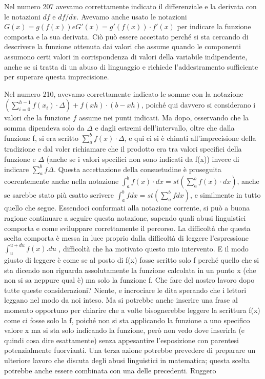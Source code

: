 Nel numero 207 avevamo correttamente indicato il differenziale e la derivata 
con le notazioni \(df\) e \(df / dx\). 
Avevamo anche usato le notazioni 
\(G(x) = g(f(x)) e G'(x) = g'(f(x))·f'(x)\)  
per indicare la funzione composta e la sua 
derivata. Ciò può essere accettato perché si sta cercando di descrivere la 
funzione ottenuta dai valori che assume quando le componenti assumono certi 
valori in corrispondenza di valori della variabile indipendente, anche se si 
tratta di un abuso di linguaggio e richiede l'addestramento sufficiente per 
superare questa imprecisione.

Nel numero 210, avevamo correttamente indicato le somme con la notazione 
\((\sum_{i=0}^{h-1} f(x_i)\cdot\Delta) + f(xh)\cdot(b-xh)\), 
poiché qui davvero si considerano i 
valori che la funzione \(f\) assume nei punti indicati. Ma dopo, osservando 
che 
la somma dipendeva solo da \(\Delta\) e dagli estremi dell'intervallo, oltre 
che 
dalla funzione f, si era scritto \(\sum_a^b f(x) \cdot \Delta\), e qui ci si 
è chinati 
all'imprecisione della tradizione e dal voler richiamare che il prodotto era 
tra valori specifici della funzione e \(\Delta\) (anche se i valori specifici 
non sono indicati da f(x)) invece di indicare \(\sum_a^b f\Delta\). 
Questa accettazione 
della consuetudine è proseguita coerentemente anche nella notazione 
\(\int_a^b f(x) \cdot dx = st (\sum_a^b f(x) \cdot dx)\), anche se sarebbe 
stato più esatto scrivere 
\(\int_a^b fdx = st(\sum_a^b fdx)\), e similmente in tutto quello che segue. 
Essendoci conformati alla notazione corrente, si può a buona ragione 
continuare a seguire questa notazione, sapendo quali abusi linguistici 
comporta e come sviluppare correttamente il percorso.
La difficoltà che questa scelta comporta è messa in luce proprio dalla 
difficoltà di leggere l'espressione \(\int_u^{u+du} f(x).du\) , difficoltà 
che ha motivato questo mio intervento. 
E il modo giusto di leggere è come se al 
posto di f(x) fosse scritto solo f perché quello che si sta dicendo non 
riguarda assolutamente la funzione calcolata in  un punto x (che non si sa 
neppure qual è) ma solo la funzione f. 
Che fare del nostro lavoro dopo tutte queste considerazioni? Niente, e 
incrociare le dita sperando che i lettori leggano nel modo da noi inteso. Ma 
si potrebbe anche inserire una frase al momento opportuno per chiarire che a 
volte bisognerebbe leggere la scrittura f(x) come ci fosse solo la f, poiché 
non si sta applicando la funzione a uno specifico valore x ma si sta solo 
indicando la funzione, però non vedo dove inserirla (e quindi cosa dire 
esattamente) senza appesantire l'esposizione con parentesi potenzialmente 
fuorvianti. Una terza azione potrebbe prevedere di preparare un ulteriore 
lavoro che discuta degli abusi linguistici in matematica; questa scelta 
potrebbe anche essere combinata con una delle precedenti.
  Ruggero
